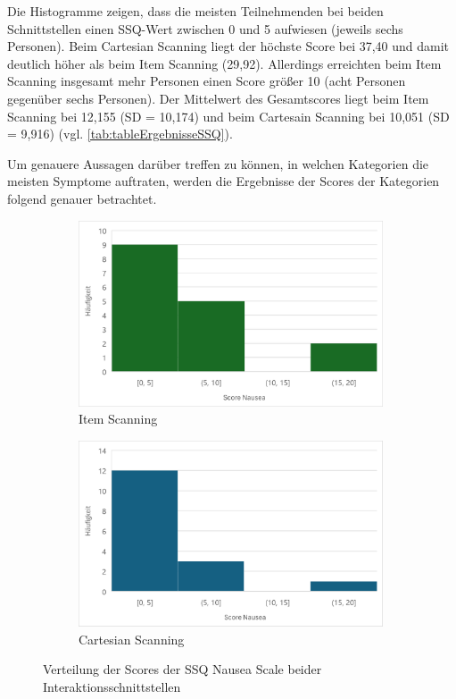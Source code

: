 Die Histogramme zeigen, dass die meisten Teilnehmenden bei beiden Schnittstellen einen SSQ-Wert zwischen 0 und 5 aufwiesen (jeweils sechs Personen). Beim Cartesian Scanning liegt der höchste Score bei 37,40 und damit deutlich höher als beim Item Scanning (29,92). Allerdings erreichten beim Item Scanning insgesamt mehr Personen einen Score größer 10 (acht Personen gegenüber sechs Personen). Der Mittelwert des Gesamtscores liegt beim Item Scanning bei 12,155 (SD = 10,174) und beim Cartesain Scanning bei 10,051 (SD = 9,916) (vgl. \autoref{tab:tableErgebnisseSSQ}).

Um genauere Aussagen darüber treffen zu können, in welchen Kategorien die meisten Symptome auftraten, werden die Ergebnisse der Scores der Kategorien folgend genauer betrachtet.

\begin{figure}
    \centering
    \begin{subfigure}{.5\textwidth}
        \centering
        \includegraphics[width=0.99\textwidth]{images/Results/Histogramm-Nausea-Scale-Item.png}
        \caption{Item Scanning}
        \label{fig:histoNauseaItem}   
    \end{subfigure}%
    \begin{subfigure}{.5\textwidth}
        \centering
        \includegraphics[width=0.99\textwidth]{images/Results/Histogramm-Nausea-Scale-Cartesian.png}
         \caption{Cartesian Scanning}
         \label{fig:histoNauseaCartesian}
    \end{subfigure}
    \caption{Verteilung der Scores der SSQ Nausea Scale beider Interaktionsschnittstellen}
    \label{fig:histoNausea}
\end{figure}

